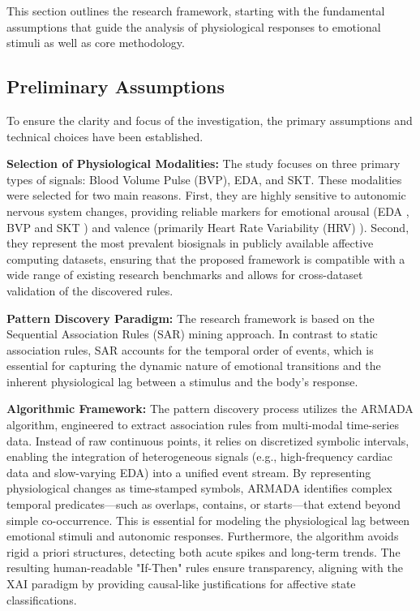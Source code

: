 \documentclass{isd}
\begin{document}
{This section outlines the research framework, starting with the fundamental assumptions that guide the analysis of physiological responses to emotional stimuli as well as core methodology.%


\subsection{Preliminary Assumptions}
To ensure the clarity and focus of the investigation, the primary assumptions and technical choices have been established.

\textbf{Selection of Physiological Modalities:} The study focuses on three primary types of signals: Blood Volume Pulse (BVP), EDA, and SKT. These modalities were selected for two main reasons. First, they are highly sensitive to autonomic nervous system changes, providing reliable markers for emotional arousal (EDA \cite{jang2014relationship, sharma2016brief}, BVP \cite{park2022photoplethysmogram, jang2014relationship, shu2018review} and SKT \cite{4462012}) and valence (primarily Heart Rate Variability (HRV) \cite{porges2007polyvagal, shaffer2017overview, appelhans2006heart}). Second, they represent the most prevalent biosignals in publicly available affective computing datasets, ensuring that the proposed framework is compatible with a wide range of existing research benchmarks and allows for cross-dataset validation of the discovered rules.

\textbf{Pattern Discovery Paradigm:} The research framework is based on the Sequential Association Rules (SAR) mining approach. In contrast to static association rules, SAR accounts for the temporal order of events, which is essential for capturing the dynamic nature of emotional transitions and the inherent physiological lag between a stimulus and the body's response.

\textbf{Algorithmic Framework:} The pattern discovery process utilizes the ARMADA algorithm, engineered to extract association rules from multi-modal time-series data. Instead of raw continuous points, it relies on discretized symbolic intervals, enabling the integration of heterogeneous signals (e.g., high-frequency cardiac data and slow-varying EDA) into a unified event stream. By representing physiological changes as time-stamped symbols, ARMADA identifies complex temporal predicates—such as overlaps, contains, or starts—that extend beyond simple co-occurrence. This is essential for modeling the physiological lag between emotional stimuli and autonomic responses. Furthermore, the algorithm avoids rigid a priori structures, detecting both acute spikes and long-term trends. The resulting human-readable "If-Then" rules ensure transparency, aligning with the XAI paradigm by providing causal-like justifications for affective state classifications.

}
\end{document}
